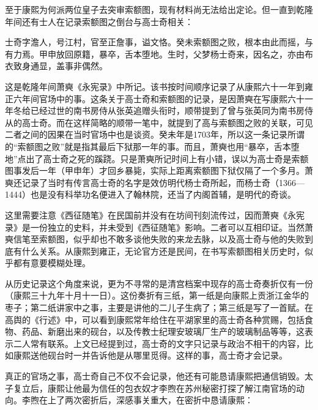 至于康熙为何派两位皇子去突审索额图，现有材料尚无法给出定论。但一直到乾隆年间还有士人在记录索额图之倒台与高士奇相关：



\begin{bookquote}士奇字澹人，号江村，官至正詹事，谥文恪。癸未索额图之败，根本由此而摇，与有力焉。甲申放回原籍，暴卒，舌本堕地。生时，父梦杨士奇来，因名之，亦由布衣致身通显，盖事非偶然。\end{bookquote}


这是乾隆年间萧奭《永宪录》中所记。该书按时间顺序记录了从康熙六十一年到雍正六年间官场中的事。这条关于高士奇和索额图的记录，是因萧奭在写康熙六十一年冬给已经过世的南书房侍从张英追赠头衔时，顺带提到了曾与张英同为南书房侍从的高士奇。而在这样简略的顺带一笔中，就提到了高与索额图之败的关联，可见二者之间的因果在当时官场中也是谈资。癸未年是1703年，所以这一条记录所谓的“索额图之败”就是指其最后下狱那一年的事。而且，萧奭也用“暴卒，舌本堕地”点出了高士奇之死的蹊跷。只是萧奭所记时间上有小错，误以为高士奇是索额图事发后一年（甲申年）才回乡暴毙，实际上距离索额图下狱仅隔了一个多月。萧奭还记录了当时有传言高士奇的名字是效仿明代杨士奇所起，而杨士奇（1366—1444）也是没有科举功名便进入了翰林院，还当了内阁首辅，是明代的奇谈。



这里需要注意《西征随笔》在民国前并没有在坊间刊刻流传过，因而萧奭《永宪录》是一份独立的史料，并未受到《西征随笔》影响。二者可以互相印证。当然萧奭信笔至索额图，似乎却也不敢多谈他失败的来龙去脉，以及高士奇与他的失败到底有什么关系。从康熙到雍正，无论官方还是民间，在书写索额图相关历史时，似乎都有意要模糊处理。



从历史记录这个角度来说，更为不寻常的是清宫档案中现存的高士奇奏折仅有一份（康熙三十九年十月十一日）。这份奏折有三纸，第一纸是向康熙上贡浙江金华的枣子；第二纸讲家中之事，主要是讲他的二儿子生病了；第三纸是写了一首赋。在高舆的《行述》中，可以看到康熙常年给住在平湖家里的高士奇各种赏赐，包括食物、药品、新磨出来的砚台，以及传教士纪理安玻璃厂生产的玻璃制品等等，这表示二人常有联系。上文已经提到过，高士奇的文字只记录与政治不相干的内容，比如康熙送他砚台时一并告诉他是从哪里觅得。这样的事，高士奇才会记录。



真正的官场之事，高士奇自己不仅不会记录，他还有可能恳请康熙把通信销毁。太子复立后，康熙让他最为信任的包衣奴才李煦在苏州秘密打探了解江南官场的动向。李煦在上了两次密折后，深感事关重大，在密折中恳请康熙：


